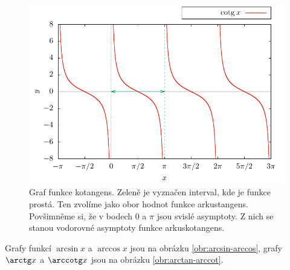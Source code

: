 \begin{figure}[H]
    \centering
    \includegraphics{Gnuplot/cv1/Figures/kotangensgraf.pdf}
    \caption{Graf funkce kotangens. Zeleně je vyznačen interval, kde je funkce prostá. Ten zvolíme jako obor hodnot funkce arkustangens. Povšimněme si, že v bodech $0$ a $\pi$ jsou svislé asymptoty. Z nich se stanou vodorovné asymptoty funkce arkuskotangens.}
    \label{fig:kotangens}
\end{figure}


Grafy funkcí $\arcsin x$ a $\arccos x$ jsou na obrázku \ref{obr:arcsin-arccos}, grafy $\arctg x$ a $\arccotg x$ jsou na obrázku \ref{obr:arctan-arccot}.

